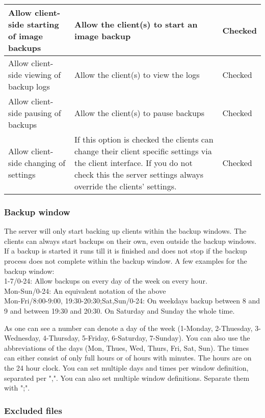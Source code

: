 \documentclass[a4paper,10pt]{article}
\begin{document}
\begin{longtable}{|p{}|p{}|p{}|}
\hline
Allow client-side starting of image backups & Allow the client(s) to start an image backup & Checked \\
\hline
Allow client-side viewing of backup logs & Allow the client(s) to view the logs & Checked \\
\hline
Allow client-side pausing of backups & Allow the client(s) to pause backups & Checked \\
\hline
Allow client-side changing of settings & If this option is checked the clients can change their client specific settings via the client interface. If you do not check this the server settings always override the clients' settings. & Checked\\
\hline
\end{longtable}

\subsubsection{Backup window}
\label{subsub_backup_window}

The server will only start backing up clients within the backup windows. The clients can always start backups on their own, even outside the backup windows. If a backup is started it runs till it is finished and does not stop if the backup process does not complete within the backup window. A few examples for the backup window:\\
1-7/0-24: Allow backups on every day of the week on every hour.\\
Mon-Sun/0-24: An equivalent notation of the above\\
Mon-Fri/8:00-9:00, 19:30-20:30;Sat,Sun/0-24: On weekdays backup between 8 and 9 and between 19:30 and 20:30. On Saturday and Sunday the whole time.

As one can see a number can denote a day of the week (1-Monday, 2-Thuesday, 3-Wednesday, 4-Thursday, 5-Friday, 6-Saturday, 7-Sunday). You can also use the abbreviations of the days (Mon, Thues, Wed, Thurs, Fri, Sat, Sun). The times can either consist of only full hours or of hours with minutes. The hours are on the 24 hour clock. You can set multiple days and times per window definition, separated per ",". You can also set multiple window definitions. Separate them with ";".

\subsubsection{Excluded files}
\label{subsub_excluded_files}
\end{document}
